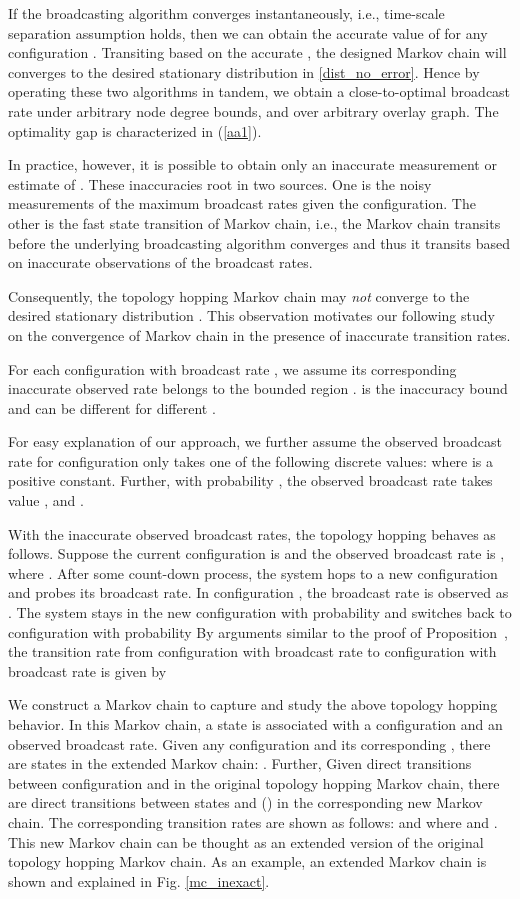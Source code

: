 \documentclass[10pt,conference]{IEEEtran}
\begin{document}
If the broadcasting algorithm converges instantaneously, i.e., time-scale
separation assumption holds, then we can obtain the accurate value
of  for any configuration . Transiting based
on the accurate , the designed Markov chain will converges
to the desired stationary distribution in \eqref{dist_no_error}.
Hence by operating these two algorithms in tandem, we obtain a close-to-optimal
broadcast rate under arbitrary node degree bounds, and over arbitrary
overlay graph. The optimality gap is characterized in (\ref{aa1}).

In practice, however, it is possible to obtain only an inaccurate
measurement or estimate of . These inaccuracies root in two
sources. One is the noisy measurements of the maximum broadcast rates
given the configuration. The other is the fast state transition of
Markov chain, i.e., the Markov chain transits before the underlying
broadcasting algorithm converges and thus it transits based on inaccurate
observations of the broadcast rates.

Consequently, the topology hopping Markov chain may \emph{not} converge
to the desired stationary distribution .
This observation motivates our following study on the convergence
of Markov chain in the presence of inaccurate transition rates.

For each configuration  with broadcast rate ,
we assume its corresponding inaccurate observed rate belongs to the
bounded region . 
is the inaccuracy bound and can be different for different .

For easy explanation of our approach, we further assume the observed
broadcast rate for configuration  only takes one of the following
 discrete values: 
 where  is a positive constant. Further, with probability
, the observed broadcast rate takes value
,  and
.

With the inaccurate observed broadcast rates, the topology hopping
behaves as follows. Suppose the current configuration is  and
the observed broadcast rate is ,
where . After some count-down process,
the system hops to a new configuration  and probes its broadcast
rate. In configuration , the broadcast rate is observed as .
The system stays in the new configuration  with probability 
and switches back to configuration  with probability 
By arguments similar to the proof of Proposition~, the transition
rate from configuration  with broadcast rate 
to configuration  with broadcast rate 
is given by 


We construct a Markov chain to capture and study the above topology
hopping behavior. In this Markov chain, a state is associated with
a configuration and an observed broadcast rate. Given any configuration
 and its corresponding , there are
 states in the extended Markov chain: .
Further, Given direct transitions between configuration  and 
in the original topology hopping Markov chain, there are direct transitions
between states  and 
()
in the corresponding new Markov chain. The corresponding transition
rates are shown as follows: 
 and 
where  and
. This new Markov chain
can be thought as an extended version of the original topology
hopping Markov chain. As an example, an extended Markov chain is
shown and explained in Fig. \ref{mc_inexact}.
\end{document}
